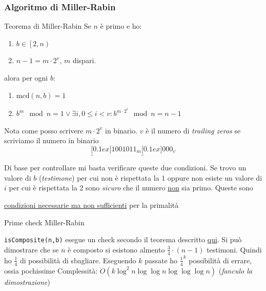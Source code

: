 \subsubsection{Algoritmo di Miller-Rabin}
\begin{teorema}{Teorema di Miller-Rabin}
	Se $n$ è primo e ho:
	\begin{enumerate}
		\item $ b \in \left[2, n\right) $
		\item $n - 1 = m \cdot 2^v$, $m$ dispari.
	\end{enumerate}
	alora per ogni $b$:

	\begin{enumerate}
		\item $\text{mcd}(n, b) = 1$
		\item $b^m \mod n = 1 \lor \exists i, 0 \leq i < v : b^{m \cdot 2^i} \mod n = n - 1$
	\end{enumerate}
\end{teorema}\label{teo-miller-rabin}
Nota come posso scrivere $ m\cdot 2^{v} $ in binario. $ v $ è il numero di \textit{trailing zeros} se scriviamo il numero in binario
\[
	\underbracket[0.1ex]{1001011}_{m}\underbracket[0.1ex]{000}_{v}
\]

Di base per controllare mi basta verificare queste due condizioni. Se trovo un valore di $ b $ (\textit{testimone}) per cui non è rispettata la 1 oppure non esiste un valore di $ i $ per cui è rispettata la 2 sono \textit{sicuro} che il  numero \underline{non} sia primo. Queste sono
\begin{center}
	\underline{condizioni necessarie ma non sufficienti} per la primalità
\end{center}

\begin{algoritmo}{Prime check Miller-Rabin}
	\begin{algorithm}[H]
		\caption{Probabilistic Prime Check}
	\end{algorithm}
\end{algoritmo}
\verb|isComposite(n,b)| esegue un check secondo il teorema descritto \hyperref[teo-miller-rabin]{qui}.
\vskip3mm
Si può dimostrare che se $ n $ è composto si esistono almento $ \frac{3}{4} \cdot (n-1) $ testimoni. Quindi ho $ \frac{1}{4} $ di possibilità di sbagliare. Eseguendo $ k $ passate ho $ \frac{1}{4}^{k} $ possibilità di errare, ossia pochissime
\vskip3mm
Complessità: $ O(k \log^2 n \log \log n \log \log \log n) $ (\textit{fanculo la dimostrazione})
